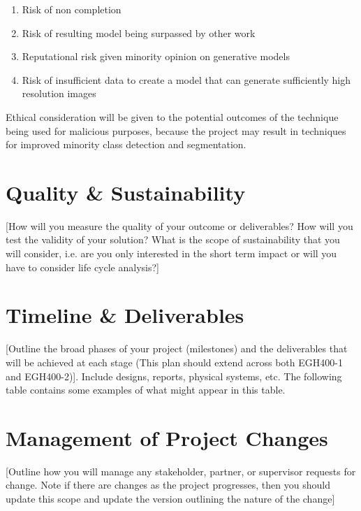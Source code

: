 \documentclass[11pt]{article}
\begin{document}
\begin{enumerate}
\item Risk of non completion 
\item Risk of resulting model being surpassed by other work
\item Reputational risk given minority opinion on generative models
\item Risk of insufficient data to create a model that can generate sufficiently high resolution images 
\end{enumerate}

Ethical consideration will be given to the potential outcomes of the technique 
being used for malicious purposes, because the project may result in techniques 
for improved minority class detection and segmentation.

\section{Quality \& Sustainability}
[How will you measure the quality of your outcome or deliverables? How will you test the validity of
your solution? What is the scope of sustainability that you will consider, i.e. are you only interested in
the short term impact or will you have to consider life cycle analysis?]



\section{Timeline \& Deliverables}
[Outline the broad phases of your project (milestones) and the deliverables that will be achieved at
each stage (This plan should extend across both EGH400-1 and EGH400-2)]. Include designs, reports,
physical systems, etc. The following table contains some examples of what might appear in this table.



\section{Management of Project Changes}
[Outline how you will manage any stakeholder, partner, or supervisor requests for change. Note if
there are changes as the project progresses, then you should update this scope and update the
version outlining the nature of the change]
\end{document}
